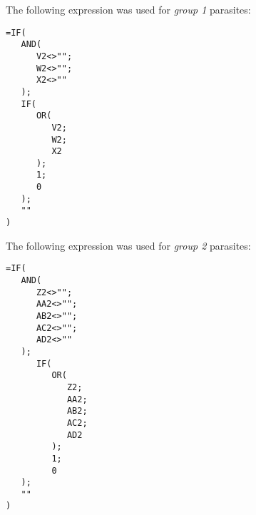 The following expression was used for \textit{group 1 }parasites:

\begin{lstlisting}
=IF(
   AND(
      V2<>"";
      W2<>"";
      X2<>""
   );
   IF(
      OR(
         V2;
         W2;
         X2
      );
      1;
      0
   );
   ""
)
\end{lstlisting}

The following expression was used for \textit{group 2} parasites:

\begin{lstlisting}
=IF(
   AND(
      Z2<>"";
      AA2<>"";
      AB2<>"";
      AC2<>"";
      AD2<>""
   );
      IF(
         OR(
            Z2;
            AA2;
            AB2;
            AC2;
            AD2
         );
         1;
         0
   );
   ""
)
\end{lstlisting}